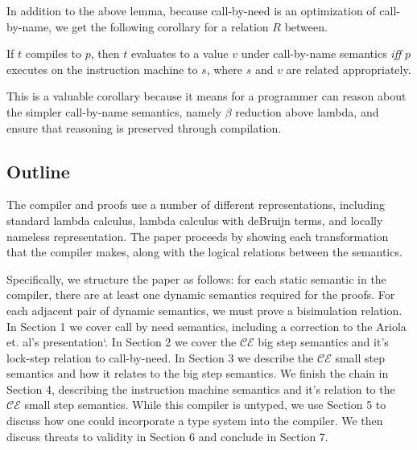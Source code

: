 In addition to the above lemma, because call-by-need is an optimization of
call-by-name, we get the following corollary for a relation $R$ between.

\begin{corollary}
If $t$ compiles to $p$, then $t$ evaluates to a value $v$ under call-by-name
semantics \emph{iff} $p$ executes on the instruction machine to $s$, where $s$
and $v$ are related appropriately.
\end{corollary}

This is a valuable corollary because it means for a programmer can reason about
the simpler call-by-name semantics, namely $\beta$ reduction above lambda, and
ensure that reasoning is preserved through compilation.

\subsection{Outline}
The compiler and proofs use a number of different representations, including
standard lambda calculus, lambda calculus with deBruijn terms, and locally
nameless representation. The paper proceeds by showing each transformation that
the compiler makes, along with the logical relations between the semantics.

Specifically, we structure the paper as follows: for each static semantic in the
compiler, there are at least one dynamic semantics required for the proofs. For
each adjacent pair of dynamic semantics, we must prove a bisimulation relation.
In Section 1 we cover call by need semantics, including a correction to the
Ariola et. al's presentation`\cite{ariola1995call}. In Section 2 we cover the
$\mathcal{CE}$ big step semantics and it's lock-step relation to call-by-need.
In Section 3 we describe the $\mathcal{CE}$ small step semantics and how it
relates to the big step semantics. We finish the chain in Section 4, describing
the instruction machine semantics and it's relation to the $\mathcal{CE}$ small
step semantics. While this compiler is untyped, we use Section 5 to discuss how
one could incorporate a type system into the compiler. We then discuss threats
to validity in Section 6 and conclude in Section 7. 

